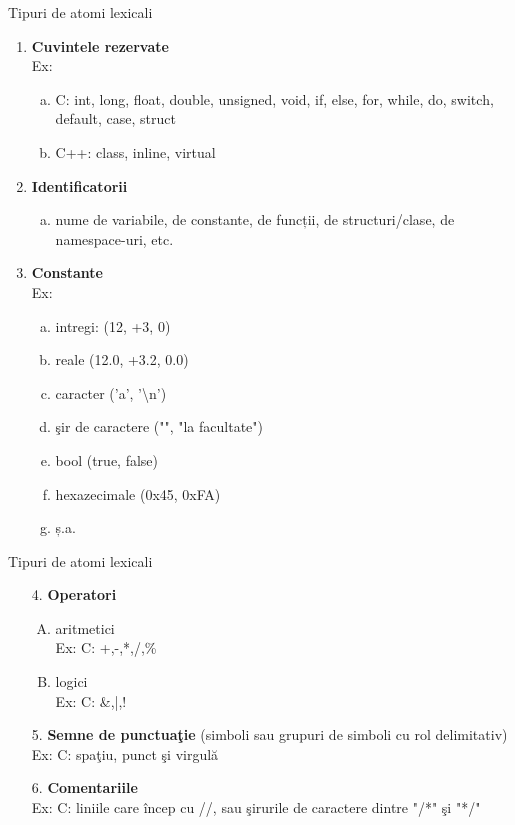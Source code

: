 \documentclass[pdf]{beamer}
\begin{document}
\begin{frame}{Tipuri de atomi lexicali}
\begin{enumerate}
	\item
	\textbf{Cuvintele rezervate}
	\\
	Ex:
	\begin{enumerate}[a) ]
		\item
		C: int, long, float, double, unsigned, void, if, else, for, while, do, switch, default, case, struct
		\item
		C++: class, inline, virtual
	\end{enumerate}	
	
	\item
	\textbf{Identificatorii}
	\begin{enumerate}[a) ]
		\item
		nume de variabile, de constante, de funcții, de structuri/clase, de namespace-uri, etc.
	\end{enumerate}
	
	\item
	\textbf{Constante }
	\\
	Ex:
	\begin{enumerate}[a) ]
		\item
		intregi: (12, +3, 0)
		\item
		reale (12.0, +3.2, 0.0)
		\item
		caracter ('a', '\textbackslash n')
		\item
		şir de caractere ("", "la facultate")
		\item
		bool (true, false)
		\item
		hexazecimale (0x45, 0xFA)
		\item
		ș.a.
	\end{enumerate}
\end{enumerate}
\end{frame}



\begin{frame}{Tipuri de atomi lexicali}
\begin{enumerate}
	\item[4.]
	\textbf{Operatori }
	\begin{enumerate}[A. ]
		\item
		aritmetici
		\\
		Ex: C: +,-,*,/,\%
		\item
		logici
		\\
		Ex: C: \&,|,!
	\end{enumerate}
	
	\item[5.]
	\textbf{Semne de punctuaţie }(simboli sau grupuri de simboli cu rol delimitativ)
	\\
	Ex: C: spaţiu, punct şi virgulă
	
	\item[6.]
	\textbf{Comentariile}
	\\
	Ex: C: liniile care încep cu //, sau şirurile de caractere dintre "/*" şi "*/"
\end{enumerate}
\end{frame}
\end{document}

